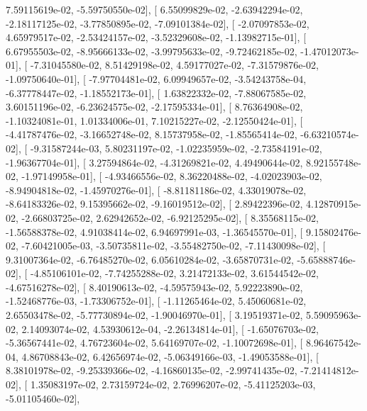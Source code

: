 \documentclass{article}
\begin{document}
          7.59115619e-02,  -5.59750550e-02],
       [  6.55099829e-02,  -2.63942294e-02,  -2.18117125e-02,
         -3.77850895e-02,  -7.09101384e-02],
       [ -2.07097853e-02,   4.65979517e-02,  -2.53424157e-02,
         -3.52329608e-02,  -1.13982715e-01],
       [  6.67955503e-02,  -8.95666133e-02,  -3.99795633e-02,
         -9.72462185e-02,  -1.47012073e-01],
       [ -7.31045580e-02,   8.51429198e-02,   4.59177027e-02,
         -7.31579876e-02,  -1.09750640e-01],
       [ -7.97704481e-02,   6.09949657e-02,  -3.54243758e-04,
         -6.37778447e-02,  -1.18552173e-01],
       [  1.63822332e-02,  -7.88067585e-02,   3.60151196e-02,
         -6.23624575e-02,  -2.17595334e-01],
       [  8.76364908e-02,  -1.10324081e-01,   1.01334006e-01,
          7.10215227e-02,  -2.12550424e-01],
       [ -4.41787476e-02,  -3.16652748e-02,   8.15737958e-02,
         -1.85565414e-02,  -6.63210574e-02],
       [ -9.31587244e-03,   5.80231197e-02,  -1.02235959e-02,
         -2.73584191e-02,  -1.96367704e-01],
       [  3.27594864e-02,  -4.31269821e-02,   4.49490644e-02,
          8.92155748e-02,  -1.97149958e-01],
       [ -4.93466556e-02,   8.36220488e-02,  -4.02023903e-02,
         -8.94904818e-02,  -1.45970276e-01],
       [ -8.81181186e-02,   4.33019078e-02,  -8.64183326e-02,
          9.15395662e-02,  -9.16019512e-02],
       [  2.89422396e-02,   4.12870915e-02,  -2.66803725e-02,
          2.62942652e-02,  -6.92125295e-02],
       [  8.35568115e-02,  -1.56588378e-02,   4.91038414e-02,
          6.94697991e-03,  -1.36545570e-01],
       [  9.15802476e-02,  -7.60421005e-03,  -3.50735811e-02,
         -3.55482750e-02,  -7.11430098e-02],
       [  9.31007364e-02,  -6.76485270e-02,   6.05610284e-02,
         -3.65870731e-02,  -5.65888746e-02],
       [ -4.85106101e-02,  -7.74255288e-02,   3.21472133e-02,
          3.61544542e-02,  -4.67516278e-02],
       [  8.40190613e-02,  -4.59575943e-02,   5.92223890e-02,
         -1.52468776e-03,  -1.73306752e-01],
       [ -1.11265464e-02,   5.45060681e-02,   2.65503478e-02,
         -5.77730894e-02,  -1.90046970e-01],
       [  3.19519371e-02,   5.59095963e-02,   2.14093074e-02,
          4.53930612e-04,  -2.26134814e-01],
       [ -1.65076703e-02,  -5.36567441e-02,   4.76723604e-02,
          5.64169707e-02,  -1.10072698e-01],
       [  8.96467542e-04,   4.86708843e-02,   6.42656974e-02,
         -5.06349166e-03,  -1.49053588e-01],
       [  8.38101978e-02,  -9.25339366e-02,  -4.16860135e-02,
         -2.99741435e-02,  -7.21414812e-02],
       [  1.35083197e-02,   2.73159724e-02,   2.76996207e-02,
         -5.41125203e-03,  -5.01105460e-02],
\end{document}
